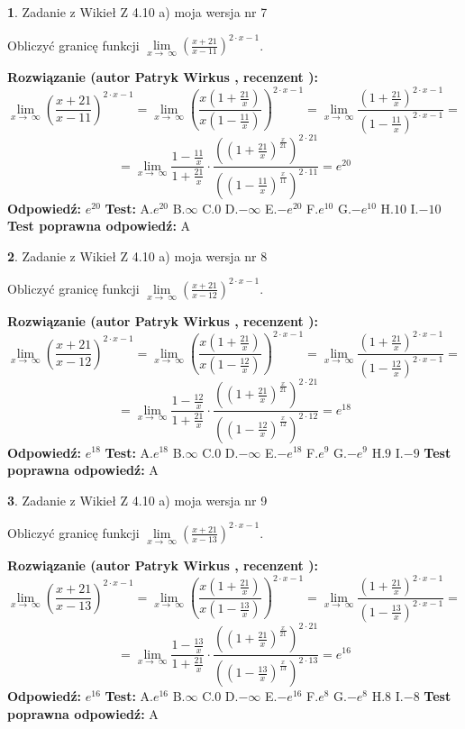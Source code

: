\documentclass[12pt, a4paper]{article}
\theoremstyle{definition} %
\newtheorem{zad}{}
\newcommand{\zadStart}[1]{\begin{zad}#1\newline}
\newcommand{\zadStop}{\end{zad}}
\newcommand{\rozwStart}[2]{\noindent \textbf{Rozwiązanie (autor #1 , recenzent #2): }\newline}
\newcommand{\rozwStop}{\newline}
\newcommand{\odpStart}{\noindent \textbf{Odpowiedź:}\newline}
\newcommand{\odpStop}{\newline}
\newcommand{\testStart}{\noindent \textbf{Test:}\newline}
\newcommand{\testStop}{\newline}
\newcommand{\kluczStart}{\noindent \textbf{Test poprawna odpowiedź:}\newline}
\newcommand{\kluczStop}{\newline}
\begin{document}
\zadStart{Zadanie z Wikieł Z 4.10 a) moja wersja nr 7}

Obliczyć granicę funkcji  $\lim\limits_{x\to\ \infty}(\frac{x+21}{x-11})^{2\cdot x-1}$.
\zadStop
\rozwStart{Patryk Wirkus}{}
$$\lim\limits_{x\to\ \infty}(\frac{x+21}{x-11})^{2\cdot x-1} = \lim\limits_{x\to\ \infty}(\frac{x(1+\frac{21}{x})}{x(1-\frac{11}{x})})^{2\cdot x-1}=\lim\limits_{x\to\ \infty}\frac{(1+\frac{21}{x})^{2\cdot x-1}}{(1-\frac{11}{x})^{2\cdot x-1}}=$$
$$=\lim\limits_{x\to\ \infty}\frac{1-\frac{11}{x}}{1+\frac{21}{x}}\cdot\frac{((1+\frac{21}{x})^{\frac{x}{21}})^{2\cdot21}}{((1-\frac{11}{x})^{\frac{x}{11}})^{2\cdot11}}=e^{20}$$
\rozwStop
\odpStart
$e^{20}$
\odpStop
\testStart
A.$e^{20}$ B.$\infty$ C.$0$ D.$-\infty$ E.$-e^{20}$
F.$e^{10}$ G.$-e^{10}$
H.$10$
I.$-10$
\testStop
\kluczStart
A
\kluczStop



\zadStart{Zadanie z Wikieł Z 4.10 a) moja wersja nr 8}

Obliczyć granicę funkcji  $\lim\limits_{x\to\ \infty}(\frac{x+21}{x-12})^{2\cdot x-1}$.
\zadStop
\rozwStart{Patryk Wirkus}{}
$$\lim\limits_{x\to\ \infty}(\frac{x+21}{x-12})^{2\cdot x-1} = \lim\limits_{x\to\ \infty}(\frac{x(1+\frac{21}{x})}{x(1-\frac{12}{x})})^{2\cdot x-1}=\lim\limits_{x\to\ \infty}\frac{(1+\frac{21}{x})^{2\cdot x-1}}{(1-\frac{12}{x})^{2\cdot x-1}}=$$
$$=\lim\limits_{x\to\ \infty}\frac{1-\frac{12}{x}}{1+\frac{21}{x}}\cdot\frac{((1+\frac{21}{x})^{\frac{x}{21}})^{2\cdot21}}{((1-\frac{12}{x})^{\frac{x}{12}})^{2\cdot12}}=e^{18}$$
\rozwStop
\odpStart
$e^{18}$
\odpStop
\testStart
A.$e^{18}$ B.$\infty$ C.$0$ D.$-\infty$ E.$-e^{18}$
F.$e^{9}$ G.$-e^{9}$
H.$9$
I.$-9$
\testStop
\kluczStart
A
\kluczStop



\zadStart{Zadanie z Wikieł Z 4.10 a) moja wersja nr 9}

Obliczyć granicę funkcji  $\lim\limits_{x\to\ \infty}(\frac{x+21}{x-13})^{2\cdot x-1}$.
\zadStop
\rozwStart{Patryk Wirkus}{}
$$\lim\limits_{x\to\ \infty}(\frac{x+21}{x-13})^{2\cdot x-1} = \lim\limits_{x\to\ \infty}(\frac{x(1+\frac{21}{x})}{x(1-\frac{13}{x})})^{2\cdot x-1}=\lim\limits_{x\to\ \infty}\frac{(1+\frac{21}{x})^{2\cdot x-1}}{(1-\frac{13}{x})^{2\cdot x-1}}=$$
$$=\lim\limits_{x\to\ \infty}\frac{1-\frac{13}{x}}{1+\frac{21}{x}}\cdot\frac{((1+\frac{21}{x})^{\frac{x}{21}})^{2\cdot21}}{((1-\frac{13}{x})^{\frac{x}{13}})^{2\cdot13}}=e^{16}$$
\rozwStop
\odpStart
$e^{16}$
\odpStop
\testStart
A.$e^{16}$ B.$\infty$ C.$0$ D.$-\infty$ E.$-e^{16}$
F.$e^{8}$ G.$-e^{8}$
H.$8$
I.$-8$
\testStop
\kluczStart
A
\kluczStop
\end{document}
